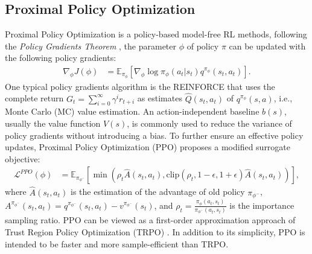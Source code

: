 \documentclass{article} %
\begin{document}
\subsection{Proximal Policy Optimization}
Proximal Policy Optimization is a policy-based model-free RL methods, following the \emph{Policy Gradients Theorem} \cite{SuttonB98RLAI}, the parameter $\phi$ of policy $\pi$ can be updated with the following policy gradients:
\begin{equation}
\begin{aligned}
    \nabla_{\phi} J(\phi) & =  \mathbb{E}_{\pi_{\phi}} \left[ \nabla_{\phi} \log \pi_{\phi}(a_t|s_t) q^{\pi_{\phi}}(s_t,a_t) \right].
\end{aligned}
\label{eqation:REINFORCE_PG}
\end{equation}
One typical policy gradients algorithm is the REINFORCE \cite{Williams92REINFORCE} that uses the complete return $G_t=\sum_{i=0}^{\infty} \gamma^{i}r_{t+i}$ as estimates $\hat{Q}(s_t,a_t)$ of $q^{\pi_{\phi}}(s,a)$, i.e., Monte Carlo (MC) value estimation.
An action-independent baseline $b(s)$, usually the value function $V(s)$, is commonly used to reduce the variance of policy gradients without introducing a bias.
To further ensure an effective policy updates, Proximal Policy Optimization (PPO) \cite{SchulmanWDRK17PPO} proposes a modified surrogate objective:
\begin{equation}
\begin{aligned}
    \mathcal{L}^{PPO}(\phi) & =  \mathbb{E}_{\pi_{\phi^{-}}} \left[ \min \left(\rho_t \hat{A}(s_t,a_t), \text{clip}(\rho_t, 1 - \epsilon, 1 + \epsilon) \hat{A}(s_t,a_t) \right) \right],
\end{aligned}
\label{eqation:PPO_objective}
\end{equation}
where $\hat{A}(s_t,a_t)$ is the estimation of the advantage of old policy $\pi_{\phi^{-}}$, $A^{\pi_{\phi^{-}}}(s_t,a_t) = q^{\pi_{\phi^{-}}}(s_t,a_t) - v^{\pi_{\phi^{-}}}(s_t)$,
and $\rho_t = \frac{\pi_{\phi}(a_t, s_t)}{\pi_{\phi^{-}}(a_t, s_t)}$ is the importance sampling ratio.
PPO can be viewed as a first-order approximation approach of Trust Region Policy Optimization (TRPO) \cite{SchulmanLAJM15TRPO}.
In addition to its simplicity, PPO is intended to be faster and more sample-efficient than TRPO.
\end{document}

